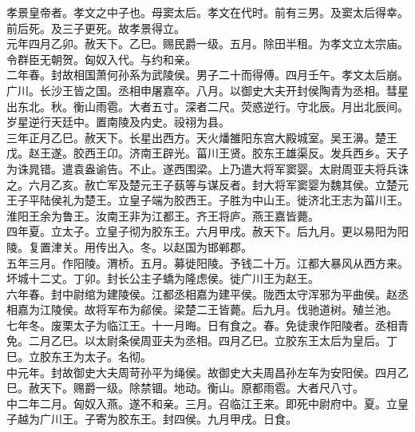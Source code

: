 \documentclass{zhvt-classic}
\begin{document}
\hspace*{2em}孝景皇帝者。孝文之中子也。母窦太后。孝文在代时。前有三男。及窦太后得幸。前后死。及三子更死。故孝景得立。\\
\hspace*{2em}元年四月乙卯。赦天下。乙巳。赐民爵一级。五月。除田半租。为孝文立太宗庙。令群臣无朝贺。匈奴入代。与约和亲。\\
\hspace*{2em}二年春。封故相国萧何孙系为武陵侯。男子二十而得傅。四月壬午。孝文太后崩。广川。长沙王皆之国。丞相申屠嘉卒。八月。以御史大夫开封侯陶青为丞相。彗星出东北。秋。衡山雨雹。大者五寸。深者二尺。荧惑逆行。守北辰。月出北辰间。岁星逆行天廷中。置南陵及内史。祋祤为县。\\
\hspace*{2em}三年正月乙巳。赦天下。长星出西方。天火燔雒阳东宫大殿城室。吴王濞。楚王戊。赵王遂。胶西王卬。济南王辟光。菑川王贤。胶东王雄渠反。发兵西乡。天子为诛晁错。遣袁盎谕告。不止。遂西围梁。上乃遣大将军窦婴。太尉周亚夫将兵诛之。六月乙亥。赦亡军及楚元王子蓺等与谋反者。封大将军窦婴为魏其侯。立楚元王子平陆侯礼为楚王。立皇子端为胶西王。子胜为中山王。徙济北王志为菑川王。淮阳王余为鲁王。汝南王非为江都王。齐王将庐。燕王嘉皆薨。\\
\hspace*{2em}四年夏。立太子。立皇子彻为胶东王。六月甲戌。赦天下。后九月。更以易阳为阳陵。复置津关。用传出入。冬。以赵国为邯郸郡。\\
\hspace*{2em}五年三月。作阳陵。渭桥。五月。募徙阳陵。予钱二十万。江都大暴风从西方来。坏城十二丈。丁卯。封长公主子蟜为隆虑侯。徙广川王为赵王。\\
\hspace*{2em}六年春。封中尉绾为建陵侯。江都丞相嘉为建平侯。陇西太守浑邪为平曲侯。赵丞相嘉为江陵侯。故将军布为鄃侯。梁楚二王皆薨。后九月。伐驰道树。殖兰池。\\
\hspace*{2em}七年冬。废栗太子为临江王。十一月晦。日有食之。春。免徒隶作阳陵者。丞相青免。二月乙巳。以太尉条侯周亚夫为丞相。四月乙巳。立胶东王太后为皇后。丁巳。立胶东王为太子。名彻。\\
\hspace*{2em}中元年。封故御史大夫周苛孙平为绳侯。故御史大夫周昌孙左车为安阳侯。四月乙巳。赦天下。赐爵一级。除禁锢。地动。衡山。原都雨雹。大者尺八寸。\\
\hspace*{2em}中二年二月。匈奴入燕。遂不和亲。三月。召临江王来。即死中尉府中。夏。立皇子越为广川王。子寄为胶东王。封四侯。九月甲戌。日食。\\
\end{document}
